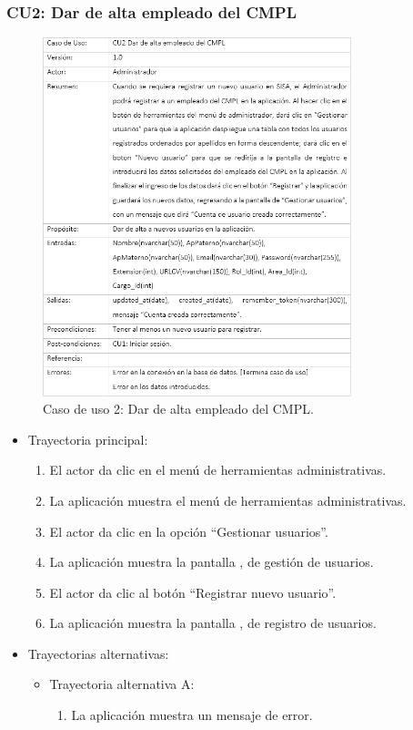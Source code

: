 		\subsubsection{CU2: Dar de alta empleado del CMPL}
			\begin{figure}[htbp!]
				\centering
					\includegraphics[width=0.8\textwidth]{images/CU/CU2}
					\caption{Caso de uso 2: Dar de alta empleado del CMPL.}
				\label{Tabla}
			\end{figure}
			
			\begin{itemize}
				\item Trayectoria principal:
					\begin{enumerate}
						\item El actor da clic en el menú de herramientas administrativas.
						\item La aplicación muestra el menú de herramientas administrativas.
						\item El actor da clic en la opción ``Gestionar usuarios''.
						\item La aplicación muestra la pantalla , de gestión de usuarios.
						\item El actor da clic al botón ``Registrar nuevo usuario''.
						\item La aplicación muestra la pantalla , de registro de usuarios.
					\end{enumerate}
				\item Trayectorias alternativas:
					\begin{itemize}
						\item Trayectoria alternativa A:
							\begin{enumerate}
								\item La aplicación muestra un mensaje de error.
							\end{enumerate}
					\end{itemize}
			\end{itemize}
			
